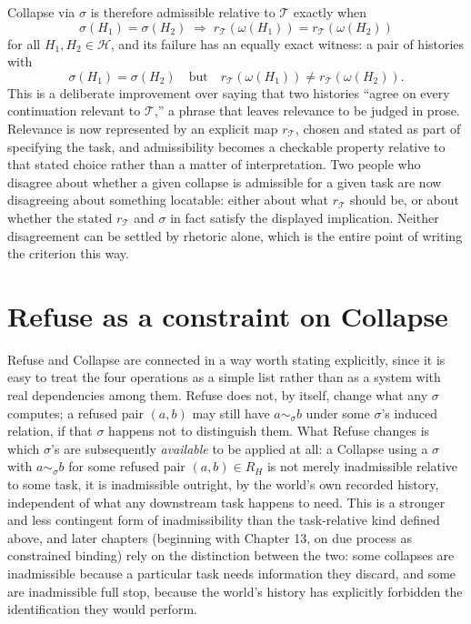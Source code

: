 \documentclass[11pt]{book}
\begin{document}
Collapse via $\sigma$ is therefore admissible relative to $\mathcal T$ exactly when
\[
\sigma(H_1)=\sigma(H_2) \;\Longrightarrow\; r_{\mathcal T}(\omega(H_1))=r_{\mathcal T}(\omega(H_2))
\]
for all $H_1,H_2\in\mathcal H$, and its failure has an equally exact witness: a pair of histories with
\[
\sigma(H_1)=\sigma(H_2) \quad\text{but}\quad r_{\mathcal T}(\omega(H_1))\ne r_{\mathcal T}(\omega(H_2)).
\]
This is a deliberate improvement over saying that two histories ``agree on every continuation relevant to $\mathcal T$,'' a phrase that leaves relevance to be judged in prose. Relevance is now represented by an explicit map $r_{\mathcal T}$, chosen and stated as part of specifying the task, and admissibility becomes a checkable property relative to that stated choice rather than a matter of interpretation. Two people who disagree about whether a given collapse is admissible for a given task are now disagreeing about something locatable: either about what $r_{\mathcal T}$ should be, or about whether the stated $r_{\mathcal T}$ and $\sigma$ in fact satisfy the displayed implication. Neither disagreement can be settled by rhetoric alone, which is the entire point of writing the criterion this way.

\section{Refuse as a constraint on Collapse}

Refuse and Collapse are connected in a way worth stating explicitly, since it is easy to treat the four operations as a simple list rather than as a system with real dependencies among them. Refuse does not, by itself, change what any $\sigma$ computes; a refused pair $(a,b)$ may still have $a\sim_\sigma b$ under some $\sigma$'s induced relation, if that $\sigma$ happens not to distinguish them. What Refuse changes is which $\sigma$'s are subsequently \emph{available} to be applied at all: a Collapse using a $\sigma$ with $a\sim_\sigma b$ for some refused pair $(a,b)\in R_H$ is not merely inadmissible relative to some task, it is inadmissible outright, by the world's own recorded history, independent of what any downstream task happens to need. This is a stronger and less contingent form of inadmissibility than the task-relative kind defined above, and later chapters (beginning with Chapter 13, on due process as constrained binding) rely on the distinction between the two: some collapses are inadmissible because a particular task needs information they discard, and some are inadmissible full stop, because the world's history has explicitly forbidden the identification they would perform.
\end{document}
